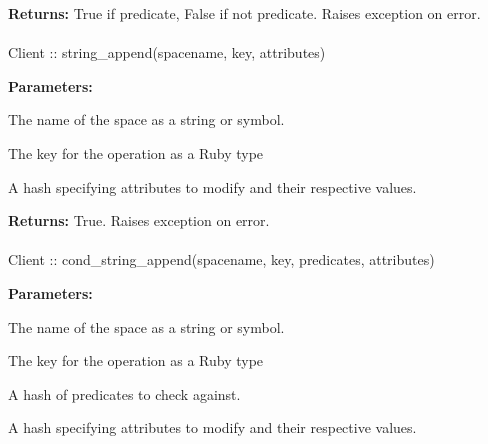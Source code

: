 \noindent\textbf{Returns:}
True if predicate, False if not predicate.  Raises exception on error.

\paragraph{}
\label{api:ruby:string_append}
\begin{rubycode}
Client :: string_append(spacename, key, attributes)
\end{rubycode}


\noindent\textbf{Parameters:}
\begin{description}[labelindent=\widthof{{\code{attributes}}},leftmargin=*,noitemsep,nolistsep,align=right]
\item[\code{spacename}] The name of the space as a string or symbol.
\item[\code{key}] The key for the operation as a Ruby type
\item[\code{attributes}] A hash specifying attributes to modify and their respective values.
\end{description}

\noindent\textbf{Returns:}
True.  Raises exception on error.

\paragraph{}
\label{api:ruby:cond_string_append}
\begin{rubycode}
Client :: cond_string_append(spacename, key, predicates, attributes)
\end{rubycode}


\noindent\textbf{Parameters:}
\begin{description}[labelindent=\widthof{{\code{predicates}}},leftmargin=*,noitemsep,nolistsep,align=right]
\item[\code{spacename}] The name of the space as a string or symbol.
\item[\code{key}] The key for the operation as a Ruby type
\item[\code{predicates}] A hash of predicates to check against.
\item[\code{attributes}] A hash specifying attributes to modify and their respective values.
\end{description}

